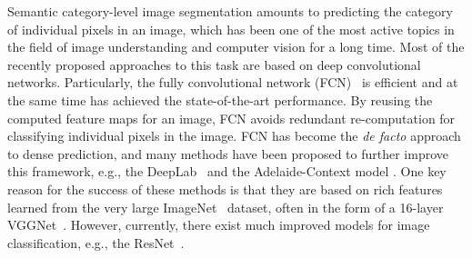 \documentclass{article}
\begin{document}
Semantic category-level image segmentation amounts to predicting the category of individual pixels in an image,
which has been one of the most active topics in the field of image understanding and computer vision for a long time.
Most of the recently proposed approaches to this task are based on deep convolutional networks.
Particularly, the fully convolutional network (FCN)~\cite{FCN.CVPR.2015.Long} is
efficient and at the same time has achieved the state-of-the-art performance.
By reusing the computed feature maps for an image,
FCN avoids redundant re-computation for classifying individual pixels in the image.
FCN has become the \emph{de facto} approach to dense prediction,
and many methods have been proposed to further improve this framework,
e.g., the DeepLab~\cite{DeepLab.ICLR.2015.Chen} and the Adelaide-Context model \cite{AdelaideContext.2016.Lin}.
One key reason for the success of these methods is that they are based on
rich features learned from the very large ImageNet~\cite{ILSVRC2015} dataset,
often in the form of a 16-layer VGGNet~\cite{VGGNet.2014.Simonyan}.
However, currently, there exist much improved models for image classification, e.g.,
the ResNet~\cite{ResNet.CVPR.2016.He,ResNet2.2016.He}.
\end{document}
